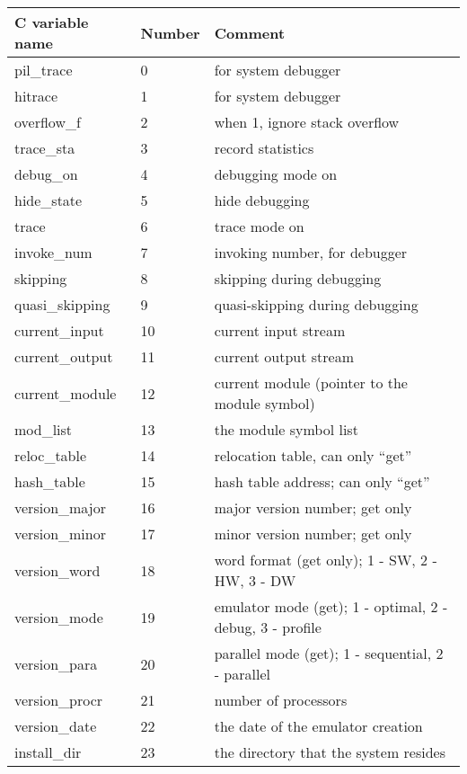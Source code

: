 \documentclass[11pt]{article}
\begin{document}
\begin{center}
\begin{tabular}{l|l|l}
\hline
C variable name & Number & Comment				\\
\hline
pil\_trace	&  0        & for system debugger		\\
hitrace		&  1        & for system debugger		\\
overflow\_f     &  2        & when 1, ignore stack overflow	\\
trace\_sta      &  3        & record statistics			\\
debug\_on       &  4        & debugging mode on			\\
hide\_state     &  5        & hide debugging			\\
trace           &  6        & trace mode on			\\
invoke\_num     &  7        & invoking number, for debugger	\\
skipping        &  8        & skipping during debugging		\\
quasi\_skipping &  9        & quasi-skipping during debugging	\\
current\_input  & 10        & current input stream		\\
current\_output & 11        & current output stream		\\
current\_module & 12        & current module (pointer to the module symbol) \\
mod\_list       & 13        & the module symbol list		\\
reloc\_table    & 14        & relocation table, can only ``get''\\
hash\_table	& 15	    & hash table address; can only ``get'' \\
version\_major	& 16	    & major version number; get only	\\
version\_minor	& 17	    & minor version number; get only	\\
version\_word	& 18	    & word format (get only); 1 - SW, 2 - HW, 3 - DW \\
version\_mode	& 19	    & emulator mode (get); 1 - optimal, 2 - debug, 
					3 - profile \\
version\_para	& 20	    & parallel mode (get); 1 - sequential,  
					2 - parallel \\
version\_procr	& 21	    & number of processors		\\
version\_date	& 22	    & the date of the emulator creation \\
install\_dir	& 23	    & the directory that the system resides \\

\end{tabular}
\end{center}
\end{document}
